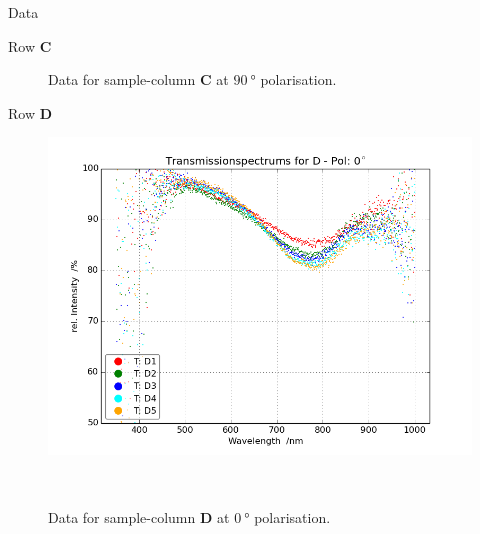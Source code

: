 \begin{appendix}
\begin{chapter}{Data}
\begin{section}{Row \textbf{C}}
\begin{figure}[ht!]
\begin{minipage}{.92\textwidth}
          \caption{Data for sample-column \textbf{C} at $\SI{90}{\degree}$
              polarisation.}
          \label{fig:TransspecRAW_CPol90}
        \end{minipage}
      \end{figure}
      
    \end{section}
    
    
    
    \newpage
    \begin{section}{Row \textbf{D}}
      \label{Appendix:DataD}
      
      \begin{figure}[ht!]
        \centering
        \begin{minipage}{.92\textwidth}
          \centering
          \includegraphics[width=\textwidth]{Figures/TransspecRAW_DPol0.png}
          \caption{Data for sample-column \textbf{D} at $\SI{0}{\degree}$
              polarisation.}
          \label{fig:TransspecRAW_DPol0}
        \end{minipage}\\
        \begin{minipage}{.92\textwidth}
          \centering

\end{minipage}
\end{figure}
\end{section}
\end{chapter}
\end{appendix}
